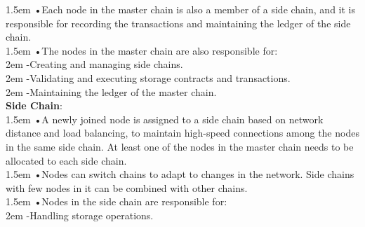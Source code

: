 \documentclass[10pt,a4paper]{article}
\begin{document}
\hangindent 1.5em
\noindent   
•\quad Each node in the master chain is also a member of a side chain, and it is responsible for recording the transactions and maintaining the ledger of the side chain.
\vspace{-0.8em}
\\

\hangindent 1.5em
\noindent   
•\quad The nodes in the master chain are also responsible for:
\vspace{-1em}
\\

\hangindent 2em
\noindent   
-\quad Creating and managing side chains.
\vspace{-1em}
\\

\hangindent 2em
\noindent   
-\quad Validating and executing storage contracts and transactions.
\vspace{-1em}
\\

\hangindent 2em
\noindent   
-\quad Maintaining the ledger of the master chain.
\vspace{-0.6em}
\\

\noindent   
 {\bf Side Chain}: 
 \vspace{-0.8em}
 \\

\hangindent 1.5em
\noindent   
•\quad A newly joined node is assigned to a side chain based on network distance and load balancing, to maintain high-speed connections among the nodes in the same side chain. At least one of the nodes in the master chain needs to be allocated to each side chain.
\vspace{-0.8em}
\\

\hangindent 1.5em
\noindent   
•\quad Nodes can switch chains to adapt to changes in the network. Side chains with few nodes in it can be combined with other chains. 
\vspace{-0.8em}
\\

\hangindent 1.5em
\noindent   
•\quad Nodes in the side chain are responsible for:
\vspace{-1em}
\\

\hangindent 2em
\noindent   
-\quad Handling storage operations.
\vspace{-1em}
\\
\end{document}
